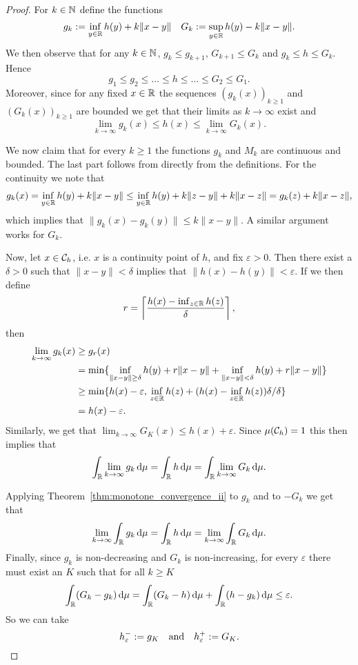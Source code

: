 \begin{proof}
For $k \in \mathbb N$ define the functions
\[
	g_k := \inf_{y \in \mathbb R} h(y) + k\|x-y\| \quad G_k := \sup_{y \in \mathbb R} h(y) - k\|x-y\|.
\]
We then observe that for any $k \in \mathbb N$, $g_k \le g_{k + 1}$, $G_{k+1} \le G_k$ and $g_k \le h \le G_k$. Hence
\[
	g_1 \le g_2 \le \dots \le h \le \dots \le G_2 \le G_1.
\]
Moreover, since for any fixed $x \in \mathbb R$ the sequences $(g_k(x))_{k \ge 1}$ and $(G_k(x))_{k \ge 1}$ are bounded we get that their limits as $k \to \infty$ exist and
\[
	\lim_{k \to \infty} g_k(x) \le h(x) \le \lim_{k \to \infty} G_k(x).
\]

We now claim that for every $k \ge 1$ the functions $g_k$ and $M_k$ are continuous and bounded. The last part follows from directly from the definitions. For the continuity we note that
\begin{align*}
	g_k(x) = \inf_{y \in \mathbb R} h(y) + k \|x-y\|
	\le \inf_{y \in \mathbb R} h(y) + k \|z-y\| +k \|x-z\|
	= g_k(z) + k\|x-z\|,
\end{align*}
which implies that $\|g_k(x) - g_k(y)\| \le k \|x-y\|$. A similar argument works for $G_k$.

Now, let $x \in \mathcal C_h$, i.e. $x$ is a continuity point of $h$, and fix $\varepsilon > 0$. Then there exist a $\delta > 0$ such that $\|x-y\| < \delta$ implies that $\|h(x) - h(y)\| < \varepsilon$. If we then define
\[
	r =  \left \lceil \frac{h(x) - \inf_{z \in \mathbb R} h(z)}{\delta} \right \rceil,
\]
then
\begin{align*}
	\lim_{k \to \infty} g_k(x) &\ge g_r(x)\\
	&= \min\{ \inf_{\|x-y\| \ge \delta} h(y) + r\|x-y\| + \inf_{\|x-y\| < \delta} h(y) + r\|x-y\|\}\\
	&\ge \min\{h(x) - \varepsilon, \, \inf_{z \in \mathbb R} h(z) + (h(x) - \inf_{z \in \mathbb R} h(z))\delta/\delta\} \\
	&= h(x) - \varepsilon.
\end{align*}
Similarly, we get that $\lim_{k \to \infty} G_K(x) \le h(x) + \varepsilon$. Since $\mu(\mathcal C_h) = 1$ this then implies that
\[
	\int_{\mathbb R} \lim_{k \to \infty} g_k \, \mathrm{d} \mu  = \int_{\mathbb R} h \, \mathrm{d} \mu 
	= \int_{\mathbb R} \lim_{k \to \infty} G_k \, \mathrm{d} \mu. 
\]

Applying Theorem~\ref{thm:monotone_convergence_ii} to $g_k$ and to $-G_k$ we get that
\[
	\lim_{k \to \infty} \int_{\mathbb R} g_k \, \mathrm{d} \mu = \int_{\mathbb R} h \, \mathrm{d} \mu
	= \lim_{k \to \infty} \int_{\mathbb R} G_k \, \mathrm{d} \mu.
\]
Finally, since $g_k$ is non-decreasing and $G_k$ is non-increasing, for every $\varepsilon$ there must exist an $K$ such that for all $k \ge K$
\[
	\int_{\mathbb R} (G_k - g_k) \, \mathrm{d} \mu = \int_{\mathbb R} (G_k - h) \, \mathrm{d} \mu + \int_{\mathbb R} (h - g_k) \, \mathrm{d} \mu \le \varepsilon. 
\]
So we can take
\[
	h^-_\varepsilon := g_K \quad \text{and} \quad h^+_\varepsilon := G_K.\qedhere
\]
\end{proof}   

